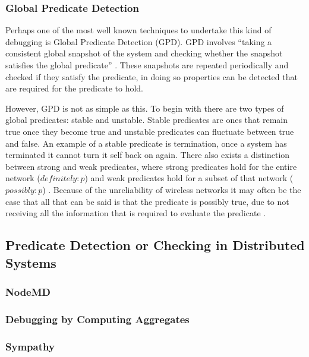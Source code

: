 \subsubsection*{Global Predicate Detection}

Perhaps one of the most well known techniques to undertake this kind of debugging is Global Predicate Detection (GPD). GPD involves ``taking a consistent global snapshot of the system and checking whether the snapshot satisfies the global predicate'' \cite{277788}. These snapshots are repeated periodically and checked if they satisfy the predicate, in doing so properties can be detected that are required for the predicate to hold.

However, GPD is not as simple as this. To begin with there are two types of global predicates: stable and unstable. Stable predicates are ones that remain true once they become true \cite{277788} and unstable predicates can fluctuate between true and false. An example of a stable predicate is termination, once a system has terminated it cannot turn it self back on again. There also exists a distinction between strong and weak predicates, where strong predicates hold for the entire network ($definitely : p$) and weak predicates hold for a subset of that network ($possibly : p$) \cite{553309,345831}. Because of the unreliability of wireless networks it may often be the case that all that can be said is that the predicate is possibly true, due to not receiving all the information that is required to evaluate the predicate \cite{?}.


\subsection{Predicate Detection or Checking in Distributed Systems}

\subsubsection*{NodeMD}
\cite{NodeMD}


\subsubsection*{Debugging by Computing Aggregates}
\cite{1203364}

\subsubsection*{Sympathy}

